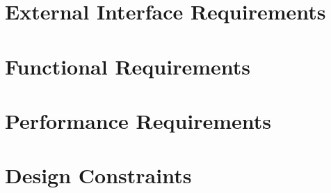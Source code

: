 \section{External Interface Requirements}

\section{Functional Requirements}

\section{Performance Requirements}

\section{Design Constraints}
